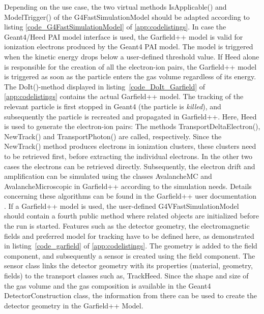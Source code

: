 \documentclass[preprint,12pt,sort&compress]{elsarticle}
\begin{document}
Depending on the use case, the two virtual methods IsApplicable() and ModelTrigger() of the G4FastSimulationModel should be adapted according to listing \ref{code_G4FastSimulationModel} of \ref{app:codelistings}. In case the Geant4/Heed PAI model interface is used, the Garfield++ model is valid for ionization electrons produced by the Geant4 PAI model. The model is triggered when the kinetic energy drops below a user-defined threshold value. If Heed alone is responsible for the creation of all the electron-ion pairs, the Garfield++ model is triggered as soon as the particle enters the gas volume regardless of its energy. The DoIt()-method displayed in listing~\ref{code_DoIt_Garfield} of \ref{app:codelistings} contains the actual Garfield++ model. The tracking of the relevant particle is first stopped in Geant4 (the particle is \textit{killed}), and subsequently the particle is recreated  and propagated in Garfield++. Here, Heed is used to generate the electron-ion pairs: The methods TransportDeltaElectron(), NewTrack() and TransportPhoton() are called, respectively. Since the NewTrack() method produces electrons in ionization clusters, these clusters need to be retrieved first, before extracting the individual electrons. In the other two cases the electrons can be retrieved directly. Subsequently, the electron drift and amplification can be simulated using the classes AvalancheMC and AvalancheMicroscopic in Garfield++ according to the simulation needs. Details concerning these algorithms can be found in the Garfield++ user documentation~\cite{Garfieldpp} . If a Garfield++ model is used, the user-defined G4VFast\-Simulation\-Model should contain a fourth public method where related objects are initialized before the run is started. Features such as the detector geometry, the electromagnetic fields and preferred model for tracking have to be defined here, as demonstrated in listing~\ref{code_garfield} of \ref{app:codelistings}. The geometry is added to the field component, and subsequently a sensor is created using the field component. The sensor class links the detector geometry with its properties (material, geometry, fields) to the transport classes such as, TrackHeed. Since the shape and size of the gas volume and the gas composition is available in the Geant4 DetectorConstruction class, the information from there can be used to create the detector geometry in the Garfield++ Model.
\end{document}
